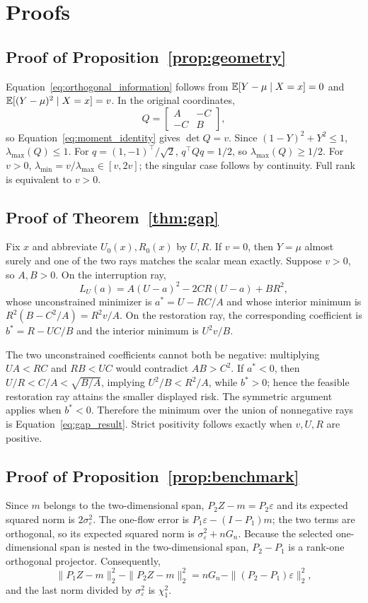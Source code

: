 \section{Proofs}

\subsection{Proof of Proposition~\ref{prop:geometry}}
Equation~\eqref{eq:orthogonal_information} follows from $\mathbb{E}[Y-\mu\mid X=x]=0$ and $\mathbb{E}[(Y-\mu)^2\mid X=x]=v$. In the original coordinates,
\[
Q=\begin{bmatrix}A&-C\\-C&B\end{bmatrix},
\]
so Equation~\eqref{eq:moment_identity} gives $\det Q=v$. Since $(1-Y)^2+Y^2\le1$, $\lambda_{\max}(Q)\le1$. For $q=(1,-1)^\top/\sqrt2$, $q^\top Qq=1/2$, so $\lambda_{\max}(Q)\ge1/2$. For $v>0$, $\lambda_{\min}=v/\lambda_{\max}\in[v,2v]$; the singular case follows by continuity. Full rank is equivalent to $v>0$.

\subsection{Proof of Theorem~\ref{thm:gap}}
Fix $x$ and abbreviate $U_0(x),R_0(x)$ by $U,R$. If $v=0$, then $Y=\mu$ almost surely and one of the two rays matches the scalar mean exactly. Suppose $v>0$, so $A,B>0$. On the interruption ray,
\[
L_U(a)=A(U-a)^2-2CR(U-a)+BR^2,
\]
whose unconstrained minimizer is $a^*=U-RC/A$ and whose interior minimum is $R^2(B-C^2/A)=R^2v/A$. On the restoration ray, the corresponding coefficient is $b^*=R-UC/B$ and the interior minimum is $U^2v/B$.

The two unconstrained coefficients cannot both be negative: multiplying $UA<RC$ and $RB<UC$ would contradict $AB>C^2$. If $a^*<0$, then $U/R<C/A<\sqrt{B/A}$, implying $U^2/B<R^2/A$, while $b^*>0$; hence the feasible restoration ray attains the smaller displayed risk. The symmetric argument applies when $b^*<0$. Therefore the minimum over the union of nonnegative rays is Equation~\eqref{eq:gap_result}. Strict positivity follows exactly when $v,U,R$ are positive.

\subsection{Proof of Proposition~\ref{prop:benchmark}}
Since $m$ belongs to the two-dimensional span, $P_2Z-m=P_2\varepsilon$ and its expected squared norm is $2\sigma_\varepsilon^2$. The one-flow error is $P_1\varepsilon-(I-P_1)m$; the two terms are orthogonal, so its expected squared norm is $\sigma_\varepsilon^2+nG_n$. Because the selected one-dimensional span is nested in the two-dimensional span, $P_2-P_1$ is a rank-one orthogonal projector. Consequently,
\[
\|P_1Z-m\|_2^2-\|P_2Z-m\|_2^2
=nG_n-\|(P_2-P_1)\varepsilon\|_2^2,
\]
and the last norm divided by $\sigma_\varepsilon^2$ is $\chi_1^2$.

